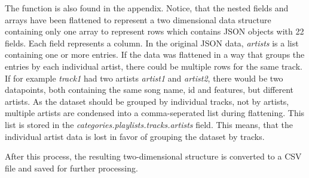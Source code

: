 The function is also found in the appendix.
Notice, that the nested fields and arrays have been flattened to represent a two dimensional data structure
containing only one array to represent rows which contains JSON objects with 22 fields. Each field represents
a column. In the original JSON data, \emph{artists} is a list containing one or more entries.
If the data was flattened in a way that groups the entries by each individual artist,
there could be multiple rows for the same track.
If for example \emph{track1} had two artists \emph{artist1} and \emph{artist2}, there would be two datapoints,
both containing the same song name, id and features, but different artists.
As the dataset should be grouped by individual tracks, not by artists,
multiple artists are condensed into a comma-seperated list during flattening.
This list is stored in the \emph{categories.playlists.tracks.artists} field.
This means, that the individual artist data is lost in favor of grouping the dataset by tracks.

After this process, the resulting two-dimensional structure is converted to a CSV file and saved for
further processing.